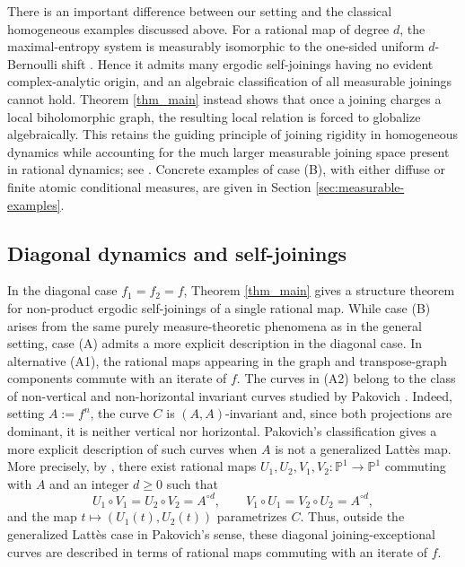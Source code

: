 \documentclass[11pt]{amsart}
\numberwithin{equation}{section}
\theoremstyle{plain}
\theoremstyle{definition}
\theoremstyle{remark}
\begin{document}
\medskip

There is
an important difference
between our setting and the classical
homogeneous examples discussed above. For a rational map of degree $d$, the maximal-entropy system is
measurably isomorphic to the one-sided uniform $d$-Bernoulli shift
\cite{HeicklenHoffman,ManeBernoulli}.
Hence it admits many ergodic
self-joinings having no evident complex-analytic origin, and
an
algebraic classification of all measurable joinings cannot hold.
Theorem \ref{thm_main} instead shows that once a joining charges a
local biholomorphic graph, the resulting local relation is forced to
globalize algebraically. 
This retains the guiding principle of joining
rigidity in homogeneous dynamics while accounting for the much larger
measurable joining space present in rational dynamics; see
\cite{Ratner1983,EinsiedlerLindenstrauss2007,
EinsiedlerLindenstrauss2019,MohammadiOh2016,OhPan2019,Pan2018}.
Concrete examples of case \textup{(B)}, with either diffuse or finite
atomic conditional measures, are given in Section
\ref{sec:measurable-examples}.


\subsection{Diagonal dynamics and self-joinings}
\label{sec:self-joinings}
In the diagonal case $f_1=f_2=f$, Theorem \ref{thm_main} gives a
structure theorem for non-product ergodic self-joinings of a single
rational map. 
While case \textup{(B)} arises from the same purely
measure-theoretic phenomena as in the general setting, case
\textup{(A)} admits a more explicit description in the diagonal case.
In alternative \textup{(A1)}, the rational maps appearing in the
graph and transpose-graph components commute with an iterate of $f$.
The curves in \textup{(A2)} belong to the class of non-vertical and
non-horizontal invariant curves studied by Pakovich
\cite{PakovichInvariantCurves}.
Indeed, setting
$A:=f^n$, the curve $C$ is $(A,A)$-invariant and, since both
projections are dominant, it is neither vertical nor horizontal.
Pakovich's classification gives a more explicit description of such
curves when $A$ is not a generalized Latt\`es map.
More precisely, by
\cite[Theorem 1.2]{PakovichInvariantCurves},
there exist rational maps
$U_1,U_2,V_1,V_2\colon\mathbb P^1\to\mathbb P^1$ commuting with $A$
and an integer $d\geq0$ such that
$$
U_1\circ V_1=U_2\circ V_2=A^{\circ d},
\qquad
V_1\circ U_1=V_2\circ U_2=A^{\circ d},
$$ and the map
$t\mapsto(U_1(t),U_2(t))$ parametrizes $C$.
Thus, outside the generalized Latt\`es case in Pakovich's sense,
these diagonal joining-exceptional curves are described in terms of
rational maps commuting with an iterate of $f$.
\end{document}
